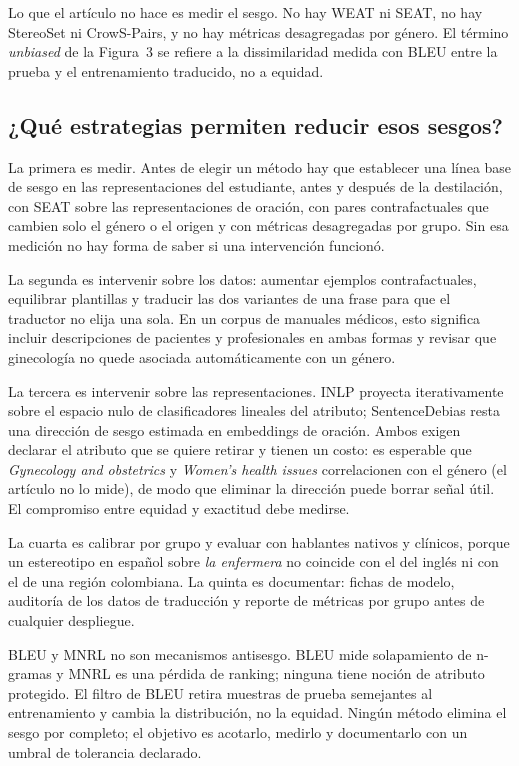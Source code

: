 Lo que el artículo no hace es medir el sesgo. No hay WEAT ni SEAT, no hay StereoSet ni CrowS-Pairs, y no hay métricas desagregadas por género. El término \textit{unbiased} de la Figura~3 se refiere a la dissimilaridad medida con BLEU entre la prueba y el entrenamiento traducido, no a equidad.

\subsection{¿Qué estrategias permiten reducir esos sesgos?}

La primera es medir. Antes de elegir un método hay que establecer una línea base de sesgo en las representaciones del estudiante, antes y después de la destilación, con SEAT sobre las representaciones de oración, con pares contrafactuales que cambien solo el género o el origen y con métricas desagregadas por grupo. Sin esa medición no hay forma de saber si una intervención funcionó.

La segunda es intervenir sobre los datos: aumentar ejemplos contrafactuales, equilibrar plantillas y traducir las dos variantes de una frase para que el traductor no elija una sola. En un corpus de manuales médicos, esto significa incluir descripciones de pacientes y profesionales en ambas formas y revisar que ginecología no quede asociada automáticamente con un género.

La tercera es intervenir sobre las representaciones. INLP \cite{ravfogel2020} proyecta iterativamente sobre el espacio nulo de clasificadores lineales del atributo; SentenceDebias \cite{liang2020} resta una dirección de sesgo estimada en embeddings de oración. Ambos exigen declarar el atributo que se quiere retirar y tienen un costo: es esperable que \textit{Gynecology and obstetrics} y \textit{Women's health issues} correlacionen con el género (el artículo no lo mide), de modo que eliminar la dirección puede borrar señal útil. El compromiso entre equidad y exactitud debe medirse.

La cuarta es calibrar por grupo y evaluar con hablantes nativos y clínicos, porque un estereotipo en español sobre \textit{la enfermera} no coincide con el del inglés ni con el de una región colombiana. La quinta es documentar: fichas de modelo, auditoría de los datos de traducción y reporte de métricas por grupo antes de cualquier despliegue.

BLEU y MNRL no son mecanismos antisesgo. BLEU mide solapamiento de n-gramas y MNRL es una pérdida de ranking; ninguna tiene noción de atributo protegido. El filtro de BLEU retira muestras de prueba semejantes al entrenamiento y cambia la distribución, no la equidad. Ningún método elimina el sesgo por completo; el objetivo es acotarlo, medirlo y documentarlo con un umbral de tolerancia declarado.

